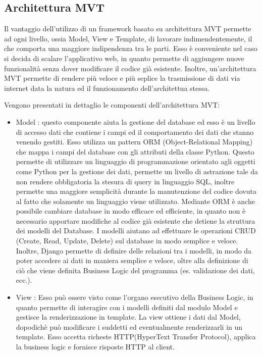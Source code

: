 \subsection{Architettura MVT}
Il vantaggio dell'utilizzo di un framework basato su architettura MVT permette ad ogni livello, ossia Model, View e Template, di lavorare indimendentemente, il che comporta una maggiore indipendenza tra le parti. Esso è conveniente nel caso si decida di scalare l'applicativo web, in quanto permette di aggiungere nuove funzionalità senza dover modificare il codice già esistente. Inoltre, un'architettura MVT permette di rendere più veloce e più seplice la trasmissione di dati via internet data la natura ed il funzionamento dell'architettua stessa.


Vengono presentati in dettaglio le componenti dell'architettura MVT:
\begin{itemize}
    \item Model : questo componente aiuta la gestione del database ed esso è un livello di accesso dati che contiene i campi ed il comportamento dei dati che stanno venendo gestiti. Esso utilizza un pattern ORM (Object-Relational Mapping) che mappa i campi del database con gli attributi della classe Python. Questo permette di utilizzare un linguaggio di programmazione orientato agli oggetti come Python per la gestione dei dati, permette un livello di astrazione tale da non rendere obbligatoria la stesura di query in linguaggio SQL, inoltre permette una maggiore semplicità durante la manutenzione del codice dovuta al fatto che solamente un linguaggio viene utilizzato. Mediante ORM è anche possibile cambiare database in modo efficace ed efficiente, in quanto non è necessario apportare modifiche al codice già esistente che detiene la struttura dei modelli del Database.
        I modelli aiutano  ad effettuare le operazioni CRUD (Create, Read, Update, Delete) sul database in modo semplice e veloce. Inoltre, Django permette di definire delle relazioni tra i modelli, in modo da poter accedere ai dati in maniera semplice e veloce, oltre alla definizione di ciò che viene definita Business Logic del programma (es. validazione dei dati, ecc.). \cite{django_models}
\item View : Esso può essere visto come l'organo esecutivo della Business Logic, in quanto permette di interagire con i modelli definiti dal modulo Model e  gestisce la renderizzazione in template. La view ottiene i dati dal Model, dopodichè può modificare i suddetti ed eventualmente renderizzarli in un template. Esso accetta richeste HTTP(HyperText Transfer Protocol), applica la business logic e fornisce risposte HTTP al client. \cite{django_views}

\end{itemize}
